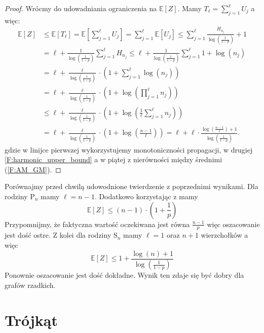 \begin{proof}
Wrócmy do udowadniania ograniczenia na $\mathbb{E}[Z]$. Mamy $T_\ell = \sum_{j=1}^{\ell} U_j$ a więc:
\begin{equation*}
\begin{aligned}
\mathbb{E}[Z] 
&\le \mathbb{E}[T_\ell] 
  = \mathbb{E}\left[\sum_{j=1}^{\ell} U_j\right] 
  = \sum_{j=1}^{\ell} \mathbb{E}[U_j] 
  \le \sum_{j=1}^{\ell} \frac{H_{n_j}}{\log(\frac{1}{1-p})} + 1 \\
&= \ell + \frac{1}{\log(\frac{1}{1-p})} \sum_{j=1}^{\ell} H_{n_j} 
  \le \ell + \frac{1}{\log(\frac{1}{1-p})} \sum_{j=1}^{\ell} 1 + \log(n_j) \\
&= \ell + \frac{\ell}{\log(\frac{1}{1-p})} \cdot \left(1 + \sum_{j=1}^{\ell} \log(n_j) \right) \\
&= \ell + \frac{\ell}{\log(\frac{1}{1-p})} \cdot \left(1 + \log \left(\prod_{j=1}^{\ell} n_j\right)\right) \\
&\le \ell + \frac{\ell}{\log(\frac{1}{1-p})} \cdot \left(1 + \log \left(\frac{1}{\ell} \sum_{j=1}^{\ell} n_j\right) \right) \\
&= \ell + \frac{\ell}{\log(\frac{1}{1-p})} \cdot \left(1 + \log \left(\frac{n-1}{\ell}\right) \right) = \ell  + \ell \cdot \frac{\log(\frac{n-1}{\ell}) + 1}{\log(\frac{1}{1-p})}.
\end{aligned}
\end{equation*}
gdzie w linijce pierwszej wykorzystujemy monotoniczności propagacji, w drugiej \cref{F:harmonic_upper_bound} a w piątej z nierówności między średnimi (\ref{F:AM_GM}).
\end{proof}

Porównajmy przed chwilą udowodnione twierdzenie z poprzednimi wynikami. Dla rodziny $\mathrm{P}_n$ mamy $\ell = n - 1$. Dodatkowo korzystając z  mamy
\[
    \mathbb{E}[Z] \le (n-1) \cdot \left(1 + \frac{1}{p} \right)
\]
Przypomnijmy, że faktyczna wartość oczekiwana jest równa $\frac{n-1}{p}$ więc oszacowanie jest dość ostre. Z kolei dla rodziny $\mathrm{S}_n$ mamy $\ell=1$ oraz $n+1$ wierzchołków a więc
\[
    \mathbb{E}[Z] \le 1 + \frac{\log(n) + 1}{\log(\frac{1}{1-p})}
\]
Ponownie oszacowanie jest dość dokładne. Wynik ten zdaje się być dobry dla grafów rzadkich.


\section{Trójkąt}


